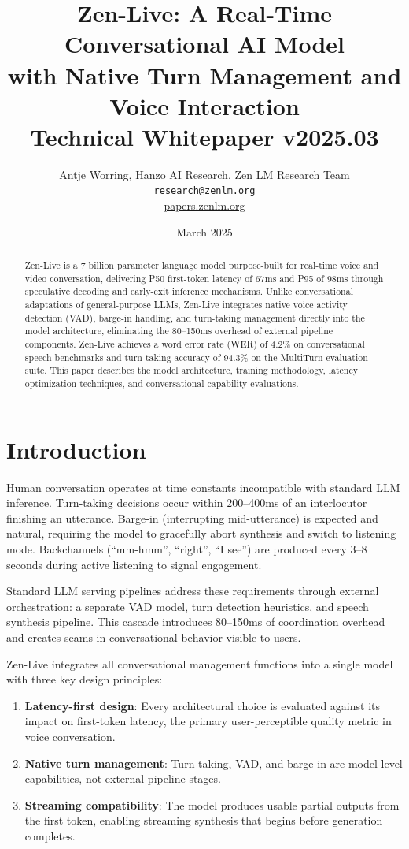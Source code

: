\documentclass[11pt,a4paper]{article}
\title{\textbf{Zen-Live: A Real-Time Conversational AI Model\\
with Native Turn Management and Voice Interaction}\\[0.5em]
\large Technical Whitepaper v2025.03}
\author{Antje Worring, Hanzo AI Research, Zen LM Research Team\\
\texttt{research@zenlm.org}\\
\href{https://papers.zenlm.org}{papers.zenlm.org}}
\date{March 2025}
\begin{document}
\maketitle

\begin{abstract}
Zen-Live is a 7 billion parameter language model purpose-built for real-time voice and video conversation, delivering P50 first-token latency of 67ms and P95 of 98ms through speculative decoding and early-exit inference mechanisms. Unlike conversational adaptations of general-purpose LLMs, Zen-Live integrates native voice activity detection (VAD), barge-in handling, and turn-taking management directly into the model architecture, eliminating the 80--150ms overhead of external pipeline components. Zen-Live achieves a word error rate (WER) of 4.2\% on conversational speech benchmarks and turn-taking accuracy of 94.3\% on the MultiTurn evaluation suite. This paper describes the model architecture, training methodology, latency optimization techniques, and conversational capability evaluations.
\end{abstract}

\tableofcontents
\newpage

\section{Introduction}

Human conversation operates at time constants incompatible with standard LLM inference. Turn-taking decisions occur within 200--400ms of an interlocutor finishing an utterance. Barge-in (interrupting mid-utterance) is expected and natural, requiring the model to gracefully abort synthesis and switch to listening mode. Backchannels (``mm-hmm'', ``right'', ``I see'') are produced every 3--8 seconds during active listening to signal engagement.

Standard LLM serving pipelines address these requirements through external orchestration: a separate VAD model, turn detection heuristics, and speech synthesis pipeline. This cascade introduces 80--150ms of coordination overhead and creates seams in conversational behavior visible to users.

Zen-Live integrates all conversational management functions into a single model with three key design principles:

\begin{enumerate}
  \item \textbf{Latency-first design}: Every architectural choice is evaluated against its impact on first-token latency, the primary user-perceptible quality metric in voice conversation.
  \item \textbf{Native turn management}: Turn-taking, VAD, and barge-in are model-level capabilities, not external pipeline stages.
  \item \textbf{Streaming compatibility}: The model produces usable partial outputs from the first token, enabling streaming synthesis that begins before generation completes.
\end{enumerate}
\end{document}
